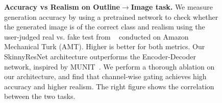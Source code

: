 \begin{figure}[ht]
\begin{minipage}[]{0.48\linewidth}
  \end{minipage}
  \caption{\small {\bf Accuracy vs Realism on Outline$\rightarrow$Image task.} We measure generation accuracy by using a pretrained network to check whether the generated image is of the correct class and realism using the user-judged real vs. fake test from ~\cite{zhang2016colorful,isola2016image2image} conducted on Amazon Mechanical Turk (AMT). Higher is better for both metrics. Our SkinnyResNet architecture outperforms the Encoder-Decoder network, inspired by MUNIT~\cite{huang2018multimodal}. We perform a thorough ablation on our architecture, and find that channel-wise gating achieves high accuracy and higher realism. The right figure shows the correlation between the two tasks.
  \vspace{-4mm}
  }
  \vspace{-3mm}
  \label{fig:acc_vs_real}
\end{figure}


